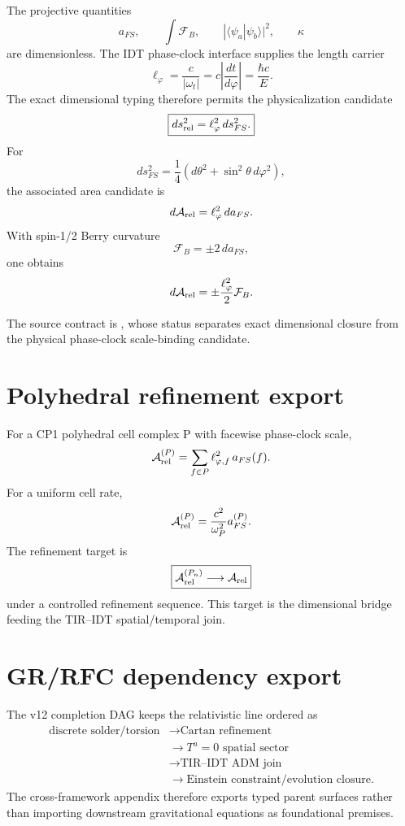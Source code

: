 \documentclass[11pt,a4paper,twoside]{book}
\def\({}%
\def\){}%
\theoremstyle{definition}
\begin{document}
The projective quantities
\[
a_{FS},\qquad
\int\mathcal F_B,\qquad
|\langle\psi_a|\psi_b\rangle|^2,\qquad
\kappa
\]
are dimensionless.  The IDT phase-clock interface supplies the length carrier
\[
\boxed{
\ell_\varphi
=\frac{c}{|\omega_t|}
=c\left|\frac{dt}{d\varphi}\right|
=\frac{\hbar c}{E}.
}
\]
The exact dimensional typing therefore permits the physicalization candidate
\[
\boxed{
ds_{\rm rel}^2
=\ell_\varphi^2\,ds_{FS}^2.
}
\]
For
\[
ds_{FS}^2
=\frac14(d\theta^2+\sin^2\theta\,d\varphi^2),
\]
the associated area candidate is
\[
d\mathcal A_{\rm rel}
=\ell_\varphi^2\,da_{FS}.
\]
With spin-\(1/2\) Berry curvature
\[
\mathcal F_B=\pm2\,da_{FS},
\]
one obtains
\[
d\mathcal A_{\rm rel}
=\pm\frac{\ell_\varphi^2}{2}\mathcal F_B.
\]

The source contract is
,
whose status separates exact dimensional closure from the physical
phase-clock scale-binding candidate.

\section{Polyhedral refinement export}

For a CP1 polyhedral cell complex \(P\) with facewise phase-clock scale,
\[
\mathcal A_{\rm rel}^{(P)}
=
\sum_{f\in P}\ell_{\varphi,f}^2\,a_{FS}(f).
\]
For a uniform cell rate,
\[
\mathcal A_{\rm rel}^{(P)}
=
\frac{c^2}{\omega_P^2}a_{FS}^{(P)}.
\]
The refinement target is
\[
\boxed{
\mathcal A_{\rm rel}^{(P_n)}
\longrightarrow
\mathcal A_{\rm rel}
}
\]
under a controlled refinement sequence.  This target is the dimensional bridge
feeding the TIR--IDT spatial/temporal join.

\section{GR/RFC dependency export}

The v12 completion DAG keeps the relativistic line ordered as
\[
\boxed{
\begin{aligned}
\text{discrete solder/torsion}
&\to\text{Cartan refinement}\\
&\to T^a=0\text{ spatial sector}\\
&\to\text{TIR--IDT ADM join}\\
&\to\text{Einstein constraint/evolution closure}.
\end{aligned}
}
\]
The cross-framework appendix therefore exports typed parent surfaces rather
than importing downstream gravitational equations as foundational premises.
\end{document}
